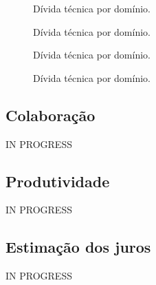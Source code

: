  \begin{figure}[H]
  \centering
  \caption{Dívida técnica por domínio.}
  \label{fig:codigo_calcula_pagerank} 
\end{figure}

 \begin{figure}[H]
  \centering
  \caption{Dívida técnica por domínio.}
  \label{fig:codigo_calcula_pagerank} 
\end{figure}


 \begin{figure}[H]
  \centering
  \caption{Dívida técnica por domínio.}
  \label{fig:codigo_calcula_pagerank} 
\end{figure}

 \begin{figure}[H]
  \centering
  \caption{Dívida técnica por domínio.}
  \label{fig:codigo_calcula_pagerank} 
\end{figure}


\subsection{Colaboração}

IN PROGRESS

\subsection{Produtividade}

IN PROGRESS

\subsection{Estimação dos juros}

IN PROGRESS








